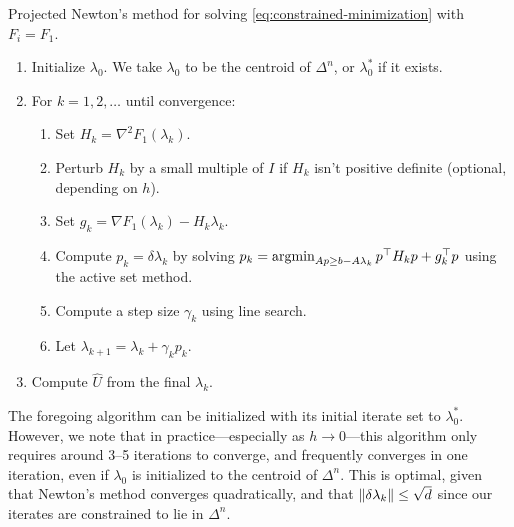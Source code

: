 \documentclass[eikonal.tex]{subfiles}
\begin{document}
\begin{algorithm}[H]
  \caption{Projected Newton's method for solving
    \cref{eq:constrained-minimization} with
    $F_i = F_1$.}\label{alg:proj-newton}
  \begin{enumerate}[nolistsep]
  \item Initialize $\lambda_0$. We take $\lambda_0$ to be the centroid
    of $\Delta^n$, or $\lambda_0^*$ if it exists.
  \item For $k = 1, 2, \hdots$ until convergence:
    \begin{enumerate}
    \item Set $H_k = \nabla^2 F_1(\lambda_k)$.
    \item Perturb $H_k$ by a small multiple of $I$ if $H_k$ isn't
      positive definite (optional, depending on $h$).
    \item Set $g_k = \nabla F_1(\lambda_k) - H_k \lambda_k$.
    \item Compute $p_k = \delta \lambda_k$ by solving
      $p_k = \operatorname{argmin}_{Ap \geq b - A\lambda_k} p^\top H_k p + g_k^\top
      p$ using the active set method.
    \item Compute a step size $\gamma_k$ using line search.
    \item Let $\lambda_{k + 1} = \lambda_k + \gamma_k p_k$.
    \end{enumerate}
  \item Compute $\hat{U}$ from the final $\lambda_k$.
  \end{enumerate}
\end{algorithm}

The foregoing algorithm can be initialized with its initial iterate
set to $\lambda_0^*$. However, we note that in practice---especially
as $h \to 0$---this algorithm only requires around 3--5 iterations to
converge, and frequently converges in one iteration, even if
$\lambda_0$ is initialized to the centroid of $\Delta^n$. This is
optimal, given that Newton's method converges quadratically, and that
$\left\|\delta \lambda_k\right\| \leq \sqrt{d}$ since our iterates are
constrained to lie in $\Delta^n$.
\end{document}
